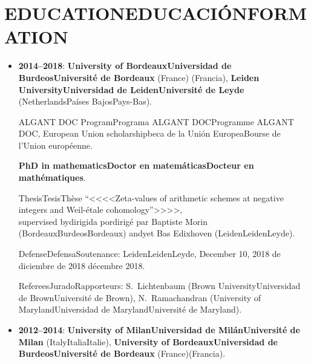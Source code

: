 \documentclass{article}
\newcommand{\biling}[3]{\ifdefined\english#1\fi\ifdefined\spanish#2\fi\ifdefined\french#3\fi}
\begin{document}
\vspace{1em}

{\color{RoyalBlue}\section*{\biling{EDUCATION}{EDUCACIÓN}{FORMATION}}}

\begin{itemize}
\item \textbf{2014--2018}: \textbf{\biling{University of Bordeaux}{Universidad de Burdeos}{Université de Bordeaux}}\biling{ (France)}{ (Francia)}{},
  \textbf{\biling{Leiden University}{Universidad de Leiden}{Université de Leyde}} (\biling{Netherlands}{Países Bajos}{Pays-Bas}).

  \biling{ALGANT DOC Program}{Programa ALGANT DOC}{Programme ALGANT DOC}, \biling{European Union scholarship}{beca de la Unión Europea}{Bourse de l'Union européenne}.

  \textbf{\biling{PhD in mathematics}{Doctor en matemáticas}{Docteur en mathématiques}}.

  \biling{Thesis}{Tesis}{Thèse} \biling{``}{<<}{<<}Zeta-values of arithmetic schemes at negative integers and Weil-étale cohomology\biling{''}{>>}{>>},\\
  \biling{supervised by}{dirigida por}{dirigé par} Baptiste Morin (\biling{Bordeaux}{Burdeos}{Bordeaux}) \biling{and}{y}{et} Bas Edixhoven (\biling{Leiden}{Leiden}{Leyde}).

  \biling{Defense}{Defensa}{Soutenance}: \biling{Leiden}{Leiden}{Leyde}, \biling{December 10, 2018}{10 de diciembre de 2018}{10 décembre 2018}.

  \biling{Referees}{Jurado}{Rapporteurs}:
  S.~Lichtenbaum (\biling{Brown University}{Universidad de Brown}{Université de Brown}),
  N.~Ramachandran (\biling{University of Maryland}{Universidad de Maryland}{Université de Maryland}).

\iffalse
  \biling{Examining committee}{Jurado}:
  P.~Cassou-Noguès (Université de Bordeaux),
  Ph.~Cassou-Noguès (Université de Bordeaux),
  D.~Holmes (Universiteit Leiden)
  R.~de Jeu (Vrije Universiteit Amsterdam),
  W.~van der Kallen (Universiteit Utrecht),
  H.~Lenstra (Universiteit Leiden),
  P.~Stevenhagen (Universiteit Leiden).
\fi

\item \textbf{2012--2014}: \textbf{\biling{University of Milan}{Universidad de Milán}{Université de Milan}} (\biling{Italy}{Italia}{Italie}),
  \textbf{\biling{University of Bordeaux}{Universidad de Burdeos}{Université de Bordeaux}}\biling{ (France)}{(Francia)}{}.


\end{itemize}
\end{document}
